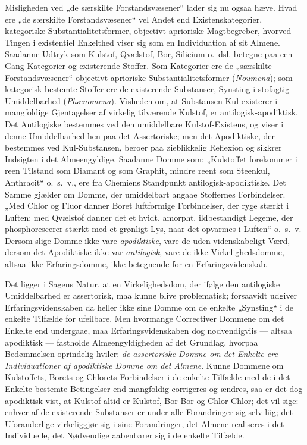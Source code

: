 \documentclass[12pt]{book}
\newcommand{\opage}[1]{\marginnote{\footnotesize\textit{[#1]}}}
\begin{document}
Misligheden ved „de særskilte Forstandsvæsener“ lader
sig nu ogsaa hæve. Hvad ere „de særskilte Forstandsvæsener“
vel Andet end Existenskategorier, kategoriske Substantialitetsformer,
objectivt aprioriske Magtbegreber, hvorved Tingen i
existentiel Enkelthed viser sig som en Individuation af sit Almene.
Saadanne Udtryk som Kulstof, Qvælstof, Bor, Silicium
o.\ dsl. betegne paa een Gang Kategorier og existerende
Stoffer. Som Kategorier ere de „særskilte Forstandsvæsener“
objectivt aprioriske Substantialitetsformer (\textit{Noumena}); som
kategorisk bestemte Stoffer ere de existerende Substanser, Synsting
i stofagtig Umiddelbarhed (\textit{Phænomena}). Visheden om,
at Substansen Kul existerer i mangfoldige Gjentagelser af
virkelig tilværende Kulstof, er antilogisk-apodiktisk. Det Antilogiske
bestemmes ved den umiddelbare Kulstof-Existens, og
viser i denne Umiddelbarhed hen paa det Assertoriske; men
det Apodiktiske, der bestemmes ved Kul-Substansen, beroer paa
øieblikkelig Reflexion og sikkrer Indsigten i det Almeengyldige.
Saadanne Domme som: „Kulstoffet forekommer i reen Tilstand
som Diamant og som Graphit, mindre reent som Steenkul,
Anthracit“ o.\ s.\ v., ere fra Chemiens Standpunkt antilogisk-apodiktiske.
Det Samme gjælder om Domme, der
umiddelbart angaae Stoffernes Forbindelser. „Med Chlor og
Fluor danner Boret luftformige Forbindelser, der ryge stærkt
i Luften; med Qvælstof danner det et hvidt, amorpht, ildbestandigt
Legeme, der phosphorescerer stærkt med et grønligt Lys,
naar det opvarmes i Luften“ o.\ s.\ v. Dersom slige Domme
ikke vare \emph{apodiktiske}, vare de uden videnskabeligt Værd,
dersom det Apodiktiske ikke var \emph{antilogisk}, vare de ikke
Virkelighedsdomme, altsaa ikke Erfaringsdomme, ikke betegnende
for en Erfaringsvidenskab.

\opage{273}Det ligger i Sagens Natur, at en Virkelighedsdom,
der ifølge den antilogiske Umiddelbarhed er assertorisk, maa
kunne blive problematisk; forsaavidt udgiver Erfaringsvidenskaben
da heller ikke sine Domme om de enkelte „Synsting“
i de enkelte Tilfælde for ufeilbare. Men hvormange Correctiver
Dommene om det Enkelte end undergaae, maa Erfaringsvidenskaben
dog nødvendigviis --- altsaa apodiktisk --- fastholde
Almeengyldigheden af det Grundlag, hvorpaa Bedømmelsen
oprindelig hviler: \emph{de assertoriske Domme om det Enkelte
ere Individuationer af apodiktiske Domme
om det Almene}. Kunne Dommene om Kulstoffets, Borets
og Chlorets Forbindelser i de enkelte Tilfælde med de i det Enkelte
bestemte Betingelser end mangfoldig corrigeres og ændres,
saa er det dog apodiktisk vist, at Kulstof altid er Kulstof,
Bor Bor og Chlor Chlor; det vil sige: enhver af de existerende
Substanser er under alle Forandringer sig selv liig; det Uforanderlige
virkeliggjør sig i sine Forandringer, det Almene realiseres
i det Individuelle, det Nødvendige aabenbarer sig i de
enkelte Tilfælde.
\end{document}

